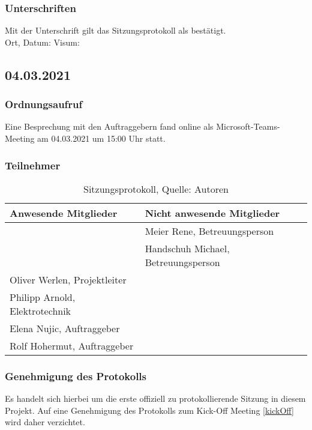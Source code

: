 \subsubsection{Unterschriften}

Mit der Unterschrift gilt das Sitzungsprotokoll als bestätigt.\\

Ort, Datum:	\underline{\hspace*{6cm}}	\hspace*{1cm} Visum:	\underline{\hspace*{4cm}}
\newpage


\subsection{04.03.2021}\label{04.03.2021}
\subsubsection{Ordnungsaufruf}
Eine Besprechung mit den Auftraggebern fand online als Microsoft-Teams-Meeting am 04.03.2021 um 15:00 Uhr statt.
\subsubsection{Teilnehmer}
\begin{table}[H]
	\setlength\extrarowheight{2pt} %
	\begin{tabularx}{\textwidth}{|X|X|}
		\hline
		\textbf{Anwesende Mitglieder} &  \textbf{Nicht anwesende Mitglieder} \\
		\hline
		& Meier Rene, Betreuungsperson  \\
		& Handschuh Michael, Betreuungsperson   \\
		Oliver Werlen, Projektleiter &  \\
		Philipp Arnold, Elektrotechnik & \\
		Elena Nujic, Auftraggeber & \\
		Rolf Hohermut, Auftraggeber & \\
		\hline
	\end{tabularx}
	\caption{ \label{tbl: Teilnehmerliste vom 04.03.2021}Sitzungsprotokoll, Quelle: Autoren}
\end{table}
\subsubsection{Genehmigung des Protokolls}
Es handelt sich hierbei um die erste offiziell zu protokollierende Sitzung in diesem Projekt. Auf eine Genehmigung des Protokolls zum Kick-Off Meeting \ref{kickOff} wird daher verzichtet. 
